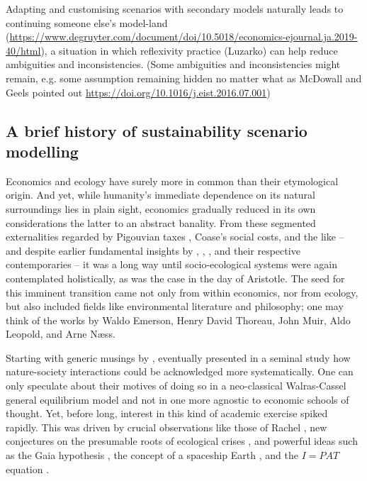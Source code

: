 \documentclass{article}
\begin{document}
Adapting and customising scenarios with secondary models naturally leads to continuing someone else's model-land (\url{https://www.degruyter.com/document/doi/10.5018/economics-ejournal.ja.2019-40/html}), a situation in which reflexivity practice (Luzarko) can help reduce ambiguities and inconsistencies. (Some ambiguities and inconsistencies might remain, e.g. some assumption remaining hidden no matter what as McDowall and Geels pointed out \url{https://doi.org/10.1016/j.eist.2016.07.001})

\begin{refsection}

\section{A brief history of sustainability scenario modelling}


Economics and ecology have surely more in common than their etymological origin. And yet, while humanity's immediate dependence on its natural surroundings lies in plain sight, economics gradually reduced in its own considerations the latter to an abstract banality. From these segmented externalities regarded by Pigouvian taxes \parencites{pigou_2017}[see also][]{baumol_1972}, Coase's \parencite*{coase_1960} social costs, and the like -- and despite earlier fundamental insights by \textcite{carlowitz_1713}, \textcite{jevons_1865}, \textcite{arrhenius_1896}, and their respective contemporaries -- it was a long way until socio-ecological systems were again contemplated holistically, as was the case in the day of Aristotle. The seed for this imminent transition came not only from within economics, nor from ecology, but also included fields like environmental literature and philosophy; one may think of the works by Waldo Emerson, Henry David Thoreau, John Muir, Aldo Leopold, and Arne Næss.

Starting with generic musings by \textcite{daly_1968,isard_1968,cumberland_1966}, \textcite{ayres_kneese_1969} eventually presented in a seminal study how nature-society interactions could be acknowledged more systematically. One can only speculate about their motives of doing so in a neo-classical Walras-Cassel general equilibrium model and not in one more agnostic to economic schools of thought. Yet, before long, interest in this kind of academic exercise spiked rapidly. This was driven by crucial observations like those of Rachel \textcite{carson_1962}, new conjectures on the presumable roots of ecological crises \parencite{white_1967}, and powerful ideas such as the Gaia hypothesis \parencite{lovelock_1972,lovelock_1974}, the concept of a spaceship Earth \parencite{boulding_1966}, and the $I=PAT$ equation \parencite{ehrlich_1972,commoner_1972,chertow_2001}.


\end{refsection}
\end{document}
